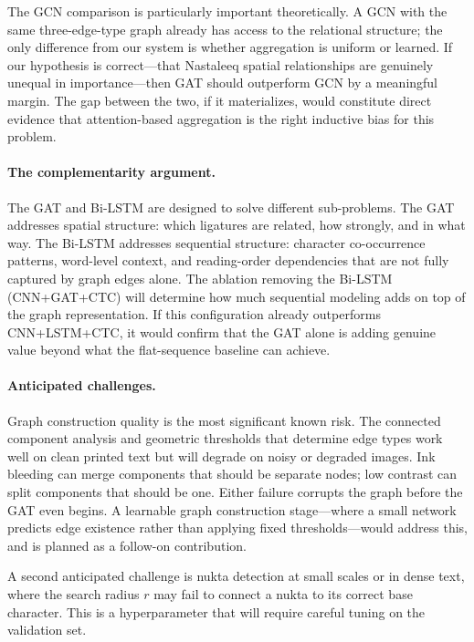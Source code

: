 \documentclass[11pt]{article}
\begin{document}
The GCN comparison is particularly important theoretically.
A GCN with the same three-edge-type graph already has access to the relational structure;
the only difference from our system is whether aggregation is uniform or learned.
If our hypothesis is correct---that Nastaleeq spatial relationships are genuinely
unequal in importance---then GAT should outperform GCN by a meaningful margin.
The gap between the two, if it materializes, would constitute direct evidence that
attention-based aggregation is the right inductive bias for this problem.

\paragraph{The complementarity argument.}
The GAT and Bi-LSTM are designed to solve different sub-problems.
The GAT addresses spatial structure: which ligatures are related, how strongly, and
in what way.
The Bi-LSTM addresses sequential structure: character co-occurrence patterns, word-level
context, and reading-order dependencies that are not fully captured by graph edges alone.
The ablation removing the Bi-LSTM (CNN+GAT+CTC) will determine how much sequential
modeling adds on top of the graph representation.
If this configuration already outperforms CNN+LSTM+CTC, it would confirm that the GAT
alone is adding genuine value beyond what the flat-sequence baseline can achieve.

\paragraph{Anticipated challenges.}
Graph construction quality is the most significant known risk.
The connected component analysis and geometric thresholds that determine edge types
work well on clean printed text but will degrade on noisy or degraded images.
Ink bleeding can merge components that should be separate nodes; low contrast can split
components that should be one.
Either failure corrupts the graph before the GAT even begins.
A learnable graph construction stage---where a small network predicts edge existence
rather than applying fixed thresholds---would address this, and is planned as a
follow-on contribution.

A second anticipated challenge is nukta detection at small scales or in dense text,
where the search radius $r$ may fail to connect a nukta to its correct base character.
This is a hyperparameter that will require careful tuning on the validation set.
\end{document}
